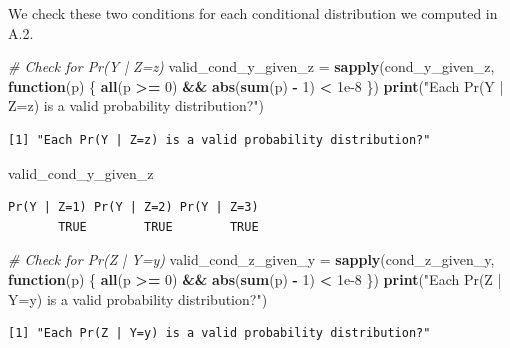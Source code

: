 \documentclass[
]{article}
\newenvironment{Shaded}{\begin{snugshade}}{\end{snugshade}}
\newcommand{\CommentTok}[1]{\textcolor[rgb]{0.56,0.35,0.01}{\textit{#1}}}
\newcommand{\ControlFlowTok}[1]{\textcolor[rgb]{0.13,0.29,0.53}{\textbf{#1}}}
\newcommand{\DecValTok}[1]{\textcolor[rgb]{0.00,0.00,0.81}{#1}}
\newcommand{\FloatTok}[1]{\textcolor[rgb]{0.00,0.00,0.81}{#1}}
\newcommand{\FunctionTok}[1]{\textcolor[rgb]{0.13,0.29,0.53}{\textbf{#1}}}
\newcommand{\NormalTok}[1]{#1}
\newcommand{\OtherTok}[1]{\textcolor[rgb]{0.56,0.35,0.01}{#1}}
\newcommand{\SpecialCharTok}[1]{\textcolor[rgb]{0.81,0.36,0.00}{\textbf{#1}}}
\newcommand{\StringTok}[1]{\textcolor[rgb]{0.31,0.60,0.02}{#1}}
\begin{document}
We check these two conditions for each conditional distribution we
computed in A.2.

\begin{Shaded}
\begin{Highlighting}[]
\CommentTok{\# Check for Pr(Y | Z=z)}
\NormalTok{valid\_cond\_y\_given\_z }\OtherTok{=} \FunctionTok{sapply}\NormalTok{(cond\_y\_given\_z, }\ControlFlowTok{function}\NormalTok{(p) \{}
  \FunctionTok{all}\NormalTok{(p }\SpecialCharTok{\textgreater{}=} \DecValTok{0}\NormalTok{) }\SpecialCharTok{\&\&} \FunctionTok{abs}\NormalTok{(}\FunctionTok{sum}\NormalTok{(p) }\SpecialCharTok{{-}} \DecValTok{1}\NormalTok{) }\SpecialCharTok{\textless{}} \FloatTok{1e{-}8}
\NormalTok{\})}
\FunctionTok{print}\NormalTok{(}\StringTok{"Each Pr(Y | Z=z) is a valid probability distribution?"}\NormalTok{)}
\end{Highlighting}
\end{Shaded}

\begin{verbatim}
[1] "Each Pr(Y | Z=z) is a valid probability distribution?"
\end{verbatim}

\begin{Shaded}
\begin{Highlighting}[]
\NormalTok{valid\_cond\_y\_given\_z}
\end{Highlighting}
\end{Shaded}

\begin{verbatim}
Pr(Y | Z=1) Pr(Y | Z=2) Pr(Y | Z=3) 
       TRUE        TRUE        TRUE 
\end{verbatim}

\begin{Shaded}
\begin{Highlighting}[]
\CommentTok{\# Check for Pr(Z | Y=y)}
\NormalTok{valid\_cond\_z\_given\_y }\OtherTok{=} \FunctionTok{sapply}\NormalTok{(cond\_z\_given\_y, }\ControlFlowTok{function}\NormalTok{(p) \{}
  \FunctionTok{all}\NormalTok{(p }\SpecialCharTok{\textgreater{}=} \DecValTok{0}\NormalTok{) }\SpecialCharTok{\&\&} \FunctionTok{abs}\NormalTok{(}\FunctionTok{sum}\NormalTok{(p) }\SpecialCharTok{{-}} \DecValTok{1}\NormalTok{) }\SpecialCharTok{\textless{}} \FloatTok{1e{-}8}
\NormalTok{\})}
\FunctionTok{print}\NormalTok{(}\StringTok{"Each Pr(Z | Y=y) is a valid probability distribution?"}\NormalTok{)}
\end{Highlighting}
\end{Shaded}

\begin{verbatim}
[1] "Each Pr(Z | Y=y) is a valid probability distribution?"
\end{verbatim}
\end{document}
